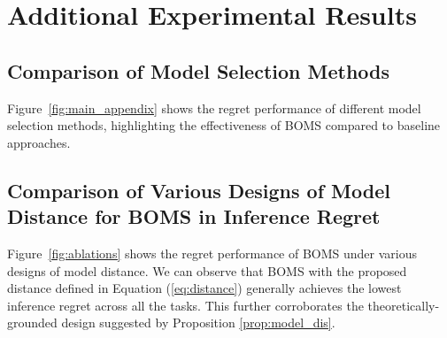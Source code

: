 \section{Additional Experimental Results}
\label{app:exp}
\subsection{Comparison of Model Selection Methods}
Figure~\ref{fig:main_appendix} shows the regret performance of different model selection methods, highlighting the effectiveness of BOMS compared to baseline approaches.


\subsection{Comparison of Various Designs of Model Distance for BOMS in Inference Regret}
{Figure~\ref{fig:ablations} shows the regret performance of BOMS under various designs of model distance. We can observe that BOMS with  the proposed distance defined in Equation (\ref{eq:distance}) generally achieves the lowest inference regret across all the tasks. This further corroborates the theoretically-grounded design suggested by Proposition \ref{prop:model_dis}.}
%




\newpage

